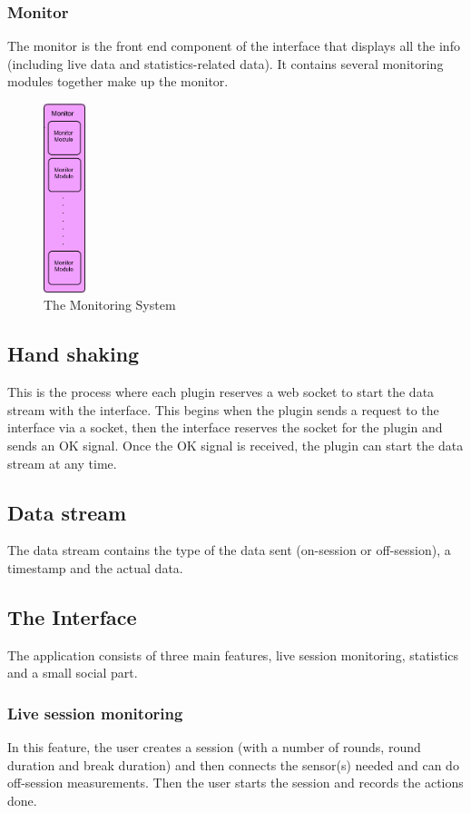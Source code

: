 \documentclass[a4paper]{article}
\begin{document}
\subsubsection{Monitor}
The monitor is the front end component of the interface that displays all the info (including live data and statistics-related data). It contains several monitoring modules together make up the monitor.

\begin{figure}[h!]
\centering
\includegraphics[height=55mm]{Monitor.png}
\caption{The Monitoring System}
\label{threadsVsSync}
\end{figure}

\subsection{Hand shaking}
This is the process where each plugin reserves a web socket to start the data stream with the interface. This begins when the plugin sends a request to the interface via a socket, then the interface reserves the socket for the plugin and sends an OK signal. Once the OK signal is received, the plugin can start the data stream at any time.

\subsection{Data stream}
The data stream contains the type of the data sent (on-session or off-session), a timestamp and the actual data.

\subsection{The Interface}
The application consists of three main features, live session monitoring, statistics and a small social part.

\subsubsection{Live session monitoring}
In this feature, the user creates a session (with a number of rounds, round duration and break duration) and then connects the sensor(s) needed and can do off-session measurements. Then the user starts the session and records the actions done.
\end{document}

